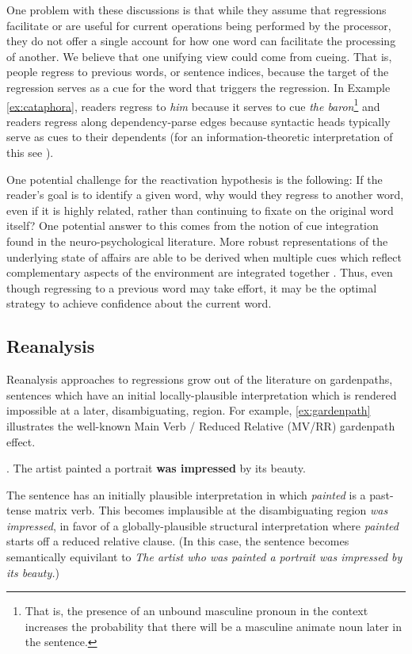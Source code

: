 \documentclass[12pt]{article}
\begin{document}
One problem with these discussions is that while they assume that regressions facilitate or are useful for current operations being performed by the processor, they do not offer a single account for how one word can facilitate the processing of another. We believe that one unifying view could come from cueing. That is, people regress to previous words, or sentence indices, because the target of the regression serves as a cue for the word that triggers the regression. In Example \ref{ex:cataphora}, readers regress to \textit{him} because it serves to cue \textit{the baron}\footnote{That is, the presence of an unbound masculine pronoun in the context increases the probability that there will be a masculine animate noun later in the sentence.} and readers regress along dependency-parse edges because syntactic heads typically serve as cues to their dependents (for an information-theoretic interpretation of this see \citet{futrell2019syntactic}).

One potential challenge for the reactivation hypothesis is the following: If the reader’s goal is to identify a given word, why would they regress to another word, even if it is highly related, rather than continuing to fixate on the original word itself? One potential answer to this comes from the notion of cue integration found in the neuro-psychological literature. More robust representations of the underlying state of affairs are able to be derived when multiple cues which reflect complementary aspects of the environment are integrated together \citep{ernst2004merging}. Thus, even though regressing to a previous word may take effort, it may be the optimal strategy to achieve confidence about the current word.


\subsection{Reanalysis}

Reanalysis approaches to regressions grow out of the literature on gardenpaths, sentences which have an initial locally-plausible interpretation which is rendered impossible at a later, disambiguating, region. For example, \ref{ex:gardenpath} illustrates the well-known Main Verb / Reduced Relative (MV/RR) gardenpath effect. 

\ex. The artist painted a portrait \textbf{was impressed} by its beauty. \label{ex:gardenpath}

The sentence has an initially plausible interpretation in which \textit{painted} is a past-tense matrix verb. This becomes implausible at the disambiguating region \textit{was impressed}, in favor of a globally-plausible structural interpretation where \textit{painted} starts off a reduced relative clause. (In this case, the sentence becomes semantically equivilant to \textit{The artist who was painted a portrait was impressed by its beauty.})
\end{document}
